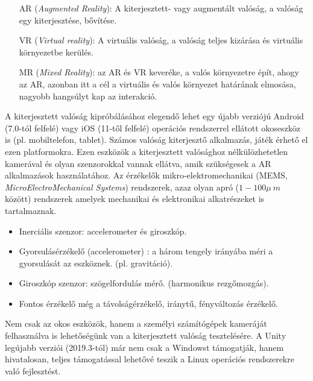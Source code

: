 
\begin{itemize}
\item[AR] (\textit{Augmented Reality}): A kiterjesztett- vagy augmentált valóság, a valóság egy kiterjesztése, bővítése. 
\item[VR] (\textit{Virtual reality}): A virtuális valóság, a valóság teljes kizárása és virtuális környezetbe kerülés.
\item[MR] (\textit{Mixed Reality}): az AR és VR keveréke, a valós környezetre épít, ahogy az AR, azonban itt a cél a virtuális és valós környezet határának elmosása, nagyobb hangsúlyt kap az interakció. 
\end{itemize}



A kiterjesztett valóság kipróbálásához elegendő lehet egy újabb verziójú Android (7.0-tól felfelé) vagy iOS (11-től felfelé) operációs rendszerrel ellátott okoseszköz is (pl. mobiltelefon, tablet).
Számos valóság kiterjesztő alkalmazás, játék érhető el ezen platformokra. 
Ezen eszközök a kiterjesztett valósághoz nélkülözhetetlen kamerával és olyan szenzorokkal vannak ellátva, amik szükségesek a AR alkalmazások használatához.
Az érzékelők mikro-elektromechanikai (MEMS, \textit{MicroElectroMechanical Systems}) 
rendszerek, azaz olyan apró ($1-100\mu\ m$ között) rendszerek amelyek mechanikai és elektronikai alkatrészeket is tartalmaznak.
\begin{itemize}
\item Inerciális szenzor: accelerometer és giroszkóp.
\item Gyorsulásérzékelő (accelerometer) : a három tengely irányába méri a gyorsulását az eszköznek. (pl. gravitáció). 
\item Giroszkóp szenzor: szögelfordulás mérő. (harmonikus rezgőmozgás).
\item Fontos érzékelő még a távolságérzékelő, iránytű, fényváltozás érzékelő.
\end{itemize}

Nem csak az okos eszközök, hanem a személyi számítógépek kameráját felhasználva is lehetőségünk van a kiterjesztett valóság tesztelésére.  A Unity legújabb verziói (2019.3-tól) már nem csak a Windowst támogatják, hanem hivatalosan, teljes támogatással lehetővé teszik a Linux operációs rendszerekre való fejlesztést.

